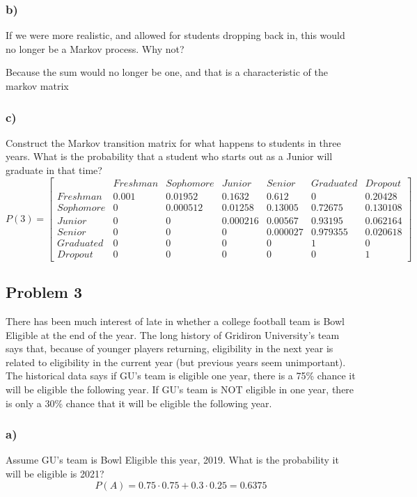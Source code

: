 \documentclass{article}
\begin{document}
\subsubsection*{b)}
If we were more realistic, and allowed for students dropping back in, this would no longer be a Markov process. Why not?
\begin{center}
    Because the sum would no longer be one, and that is a characteristic of the markov matrix
\end{center}
\subsubsection*{c)}
Construct the Markov transition matrix for what happens to students in three years. What is the probability that a student who starts out as a Junior will graduate in that time?
\begin{equation}
    P(3) = 
    \begin{bmatrix}
     & Freshman & Sophomore & Junior & Senior & Graduated & Dropout\\
    Freshman & 0.001 & 0.01952 & 0.1632 & 0.612 & 0 & 0.20428\\
    Sophomore & 0 & 0.000512 & 0.01258 & 0.13005 & 0.72675 & 0.130108\\
    Junior & 0 & 0 & 0.000216 & 0.00567 & 0.93195 & 0.062164\\
    Senior & 0 & 0 & 0 & 0.000027 & 0.979355 & 0.020618\\
    Graduated & 0 & 0 & 0 & 0 & 1 & 0\\
    Dropout & 0 & 0 & 0 & 0 & 0 & 1
    \end{bmatrix}
\end{equation}
\newpage
\subsection*{Problem 3}
There has been much interest of late in whether a college football team is Bowl Eligible at the end of the year. The long history of Gridiron University’s team says that, because of younger players returning, eligibility in the next year is related to eligibility in the current year (but previous years seem unimportant). The historical data says if GU’s team is eligible one year, there is a 75\% chance it will be eligible the following year. If GU’s team is NOT eligible in one year, there is only a 30\% chance that it will be eligible the following year.
\subsubsection*{a)}
Assume GU’s team is Bowl Eligible this year, 2019. What is the probability it will be eligible is 2021?
\begin{equation}
    P(A) = 0.75 \cdot 0.75 + 0.3 \cdot 0.25 = \boxed{0.6375}
\end{equation}
\end{document}

